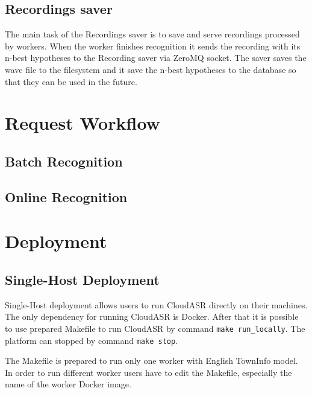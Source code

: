 \subsection{Recordings saver}
The main task of the Recordings saver is to save and serve recordings processed by workers.
When the worker finishes recognition it sends the recording with its n-best hypotheses to the Recording saver via ZeroMQ socket.
The saver saves the wave file to the filesystem and it save the n-best hypotheses to the database so that they can be used in the future.



\section{Request Workflow}
\BLIND

\subsection{Batch Recognition}
\BLIND


\subsection{Online Recognition}
\BLIND




\section{Deployment}
\BLIND

\subsection{Single-Host Deployment}
Single-Host deployment allows users to run CloudASR directly on their machines.
The only dependency for running CloudASR is Docker.
After that it is possible to use prepared Makefile to run CloudASR by command \texttt{make run\_locally}.
The platform can stopped by command \texttt{make stop}.

The Makefile is prepared to run only one worker with English TownInfo model.
In order to run different worker users have to edit the Makefile, especially the name of the worker Docker image.


